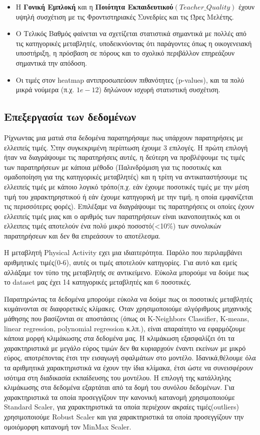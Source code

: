 \documentclass[12pt]{article}
\begin{document}
\begin{itemize}
    \item Η \textbf{Γονική Εμπλοκή } και η \textbf{Ποιότητα Εκπαιδευτικού$(Teacher\_Quality)$} έχουν υψηλή συσχέτιση με τις Φροντιστηριακές Συνεδρίες και τις Ώρες Μελέτης.
    \item Ο Τελικός Βαθμός φαίνεται να σχετίζεται στατιστικά σημαντικά με πολλές από τις κατηγορικές μεταβλητές, υποδεικνύοντας ότι παράγοντες όπως η οικογενειακή υποστήριξη, η πρόσβαση σε πόρους και το σχολικό περιβάλλον επηρεάζουν σημαντικά την απόδοση.
    \item Οι τιμές στον heatmap αντιπροσωπεύουν πιθανότητες (p-values), και τα πολύ μικρά νούμερα (π.χ. $1e-12$) δηλώνουν ισχυρή στατιστική συσχέτιση.
\end{itemize}

\subsection{Επεξεργασία των δεδομένων}
Ρίχνωντας μια ματιά στα δεδομένα παρατηρήσαμε πως υπάρχουν παρατηρήσεις με ελλειπείς τιμές. Στην συγκεκριμένη περίπτωση έχουμε 3 επιλογές. Η πρώτη επιλογή ήταν να διαγράψουμε τις παρατηρήσεις αυτές, η δεύτερη να προβλέψουμε τις τιμές των παρατηρήσεων με κάποια μέθοδο (Παλινδρόμιση για τις ποσοτικές και ομαδοποίηση για της κατηγορικές μεταβλητές) και η τρίτη να αντικαταστήσουμε τις ελλειπείς τιμές με κάποιο λογικό τρόπο(π.χ. εάν έχουμε ποσοτικές τιμές με την μέση τιμή του χαρακτηρηστικού ή εάν έχουμε κατηγορική με την τιμή, η οποία εμφανίζεται τις περισσότερες φορές). Επιλέξαμε να διαγράψουμε τις παρατηρήσεις οι οποίες έχουν ελλειπείς τιμές μιας και ο αριθμός των παρατηρήσεων είναι ικανοποιητικός και οι ελλειπεις τιμές αποτελούν ένα πολύ μικρό ποσοστό(<10\(\%\)) των συνολικών παρατηρήσεων και δεν θα επιρεάσουν το αποτέλεσμα. 

Η μεταβλητή Physical Activity εχει μια ιδιαιτερότητα. Παρόλο που περιλαμβάνει αριθμητικές τιμές(0-6), αυτές οι τιμές αποτελούν κατηγορίες. Για αυτό και εμείς αλλάξαμε τον τύπο της μεταβλητής σε αντικείμενο. Εύκολα μπορούμε να δούμε πως το dataset μας έχει 14 κατηγορικές μεταβλητές και 6 ποσοτικές.

Παρατηρώντας τα δεδομένα μπορούμε εύκολα να δούμε πως οι ποσοτικές μεταβλητές κυμάινονται σε διαφορετικές κλίμακες. 
Όταν χρησιμοποιούμε αλγόριθμους μηχανικής μάθησης που βασίζονται σε αποστάσεις (όπως οι K-Neighbors Classifier, K-means, linear regression, polynomial regression κ.λπ.), είναι απαραίτητο να εφαρμόζουμε κάποια μορφή κλιμάκωσης στα δεδομένα μας. Η κλιμάκωση εξασφαλίζει ότι τα χαρακτηριστικά με μεγάλο εύρος τιμών δεν θα κυριαρχούν έναντι εκείνων με μικρό εύρος, αποτρέποντας έτσι την εισαγωγή σφαλμάτων στο μοντέλο. Ιδανικά,θέλουμε όλα τα αριθμητικά χαρακτηριστικά να έχουν την ίδια κλίμακα, έτσι ώστε να συνεισφέρουν ισότιμα στη διαδικασία εκπαίδευσης του μοντέλου. Η επιλογή της κατάλληλης κλιμάκωσης στα δεδομένα εξαρτάται από τα δομή του συνόλου δεδομένων. Για χαρακτηριστικά τα οποία προσεγγίζουν την κανονική κατανομή χρησιμοποιούμε Standard Scaler, για χαρακτηριστικά τα οποία περιέχουν ακραίες τιμές(outliers) χρησιμοποιούμε Robust Scaler και για χαρακτηριστικά τα οποία προσεγγίζουν την ομοιόμορφη κατανομή τον MinMax Scaler.
\end{document}
